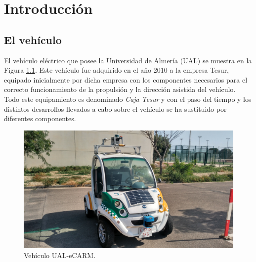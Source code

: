 \chapter{Introducción}
\section{El vehículo}
El vehículo eléctrico que posee la Universidad de Almería (UAL) se muestra en la Figura \ref{fig:vehiculo}. Este vehículo fue adquirido en el año 2010 a la empresa Tesur, equipado inicialmente por dicha empresa con los componentes necesarios para el correcto funcionamiento de la propulsión y la dirección asistida del vehículo. Todo este equipamiento es denominado \textit{Caja Tesur} y con el paso del tiempo y los distintos desarrollos llevados a cabo sobre el vehículo se ha sustituido por diferentes componentes. 

\begin{figure}[h!]
  \centering
    \includegraphics[width=1\textwidth]{Figuras/vehiculo-aparcamientos.jpg}
  \caption{Vehículo UAL-eCARM.}
  \label{fig:vehiculo}
\end{figure}
